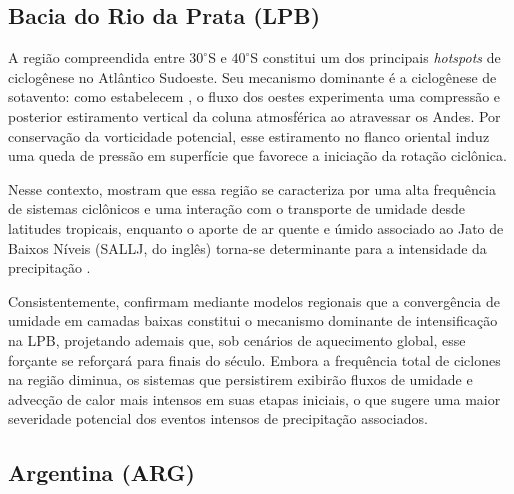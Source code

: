\subsection{Bacia do Rio da Prata (LPB)}\label{subsec:tb_lpb}

A região compreendida entre $30^\circ$S e $40^\circ$S constitui um dos principais \textit{hotspots} de ciclogênese no Atlântico Sudoeste. Seu mecanismo dominante é a ciclogênese de sotavento: como estabelecem \citet{gan1994influence}, o fluxo dos oestes experimenta uma compressão e posterior estiramento vertical da coluna atmosférica ao atravessar os Andes. Por conservação da vorticidade potencial, esse estiramento no flanco oriental induz uma queda de pressão em superfície que favorece a iniciação da rotação ciclônica. 

Nesse contexto, \citet{reboita2010south} mostram que essa região se caracteriza por uma alta frequência de sistemas ciclônicos e uma interação com o transporte de umidade desde latitudes tropicais, enquanto o aporte de ar quente e úmido associado ao Jato de Baixos Níveis (SALLJ, do inglês) torna-se determinante para a intensidade da precipitação \citep{crespo2020potential}.

Consistentemente, \citet{gramcianinov2024early} confirmam mediante modelos regionais que a convergência de umidade em camadas baixas constitui o mecanismo dominante de intensificação na LPB, projetando ademais que, sob cenários de aquecimento global, esse forçante se reforçará para finais do século. Embora a frequência total de ciclones na região diminua, os sistemas que persistirem exibirão fluxos de umidade e advecção de calor mais intensos em suas etapas iniciais, o que sugere uma maior severidade potencial dos eventos intensos de precipitação associados.

\subsection{Argentina (ARG)}\label{subsec:tb_arg}

